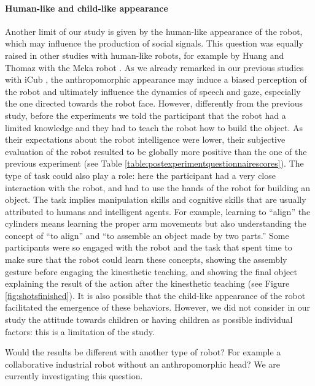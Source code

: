 \paragraph{Human-like and child-like appearance}

Another limit of our study is given by the human-like appearance of the robot, which may influence the production of social signals. This question was equally raised in other studies with human-like robots, for example by Huang and Thomaz with the Meka robot \cite{Huang2011}.
As we already remarked in our previous studies with iCub \cite{ivaldi2014frontiers}, the anthropomorphic appearance may induce a biased perception of the robot and ultimately influence the dynamics of speech and gaze, especially the one directed towards the robot face. 
However, differently from the previous study, before the experiments we told the participant that the robot had a limited knowledge and they had to teach the robot how to build the object. As their expectations about the robot intelligence were lower, their subjective evaluation of the robot resulted to be globally more positive than the one of the previous experiment (see Table \ref{table:postexperimentquestionnairescores}). 
The type of task could also play a role: here the participant had a very close interaction with the robot, and had to use the hands of the robot for building an object. The task implies manipulation skills and cognitive skills that are usually attributed to humans and intelligent agents. For example, learning to ``align'' the cylinders means learning the proper arm movements but also understanding the concept of ``to align'' and ``to assemble an object made by two parts.'' Some participants were so engaged with the robot and the task that spent time to make sure that the robot could learn these concepts, showing the assembly gesture before engaging the kinesthetic teaching, and showing the final object explaining the result of the action after the kinesthetic teaching (see Figure \ref{fig:shotsfinished}).
It is also possible that the child-like appearance of the robot facilitated the emergence of these behaviors. However, we did not consider in our study the attitude towards children or having children as possible individual factors: this is a limitation of the study.

Would the results be different with another type of robot? For example a collaborative industrial robot without an anthropomorphic head? We are currently investigating this question.




